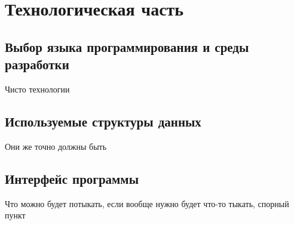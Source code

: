 \chapter{Технологическая часть}

\section{Выбор языка программирования и среды разработки}
Чисто технологии
\section{Используемые структуры данных}
Они же точно должны быть
\section{Интерфейс программы}
Что можно будет потыкать, если вообще нужно будет что-то тыкать, спорный пункт